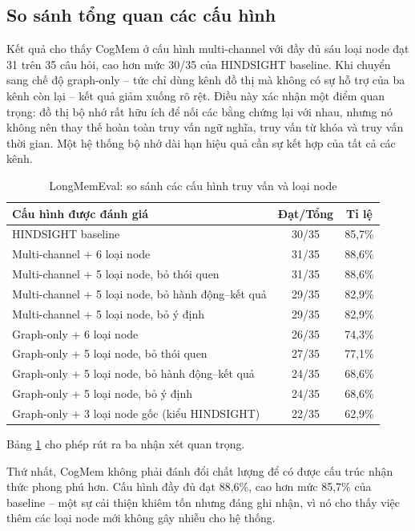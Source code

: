 \documentclass[../main.tex]{subfiles}
\begin{document}
\subsection{So sánh tổng quan các cấu hình}

Kết quả cho thấy CogMem ở cấu hình multi-channel với đầy đủ sáu loại node đạt 31 trên 35 câu hỏi, cao hơn mức 30/35 của HINDSIGHT baseline. Khi chuyển sang chế độ graph-only -- tức chỉ dùng kênh đồ thị mà không có sự hỗ trợ của ba kênh còn lại -- kết quả giảm xuống rõ rệt. Điều này xác nhận một điểm quan trọng: đồ thị bộ nhớ rất hữu ích để nối các bằng chứng lại với nhau, nhưng nó không nên thay thế hoàn toàn truy vấn ngữ nghĩa, truy vấn từ khóa và truy vấn thời gian. Một hệ thống bộ nhớ dài hạn hiệu quả cần sự kết hợp của tất cả các kênh.

\begin{table}[H]
\centering
\caption{LongMemEval: so sánh các cấu hình truy vấn và loại node}
\label{tab:longmemeval_results}
\small
\begin{tabularx}{\linewidth}{@{}p{8.5cm}cc@{}}
\toprule
\textbf{Cấu hình được đánh giá} & \textbf{Đạt/Tổng} & \textbf{Tỉ lệ} \\
\midrule
HINDSIGHT baseline & 30/35 & 85,7\% \\
Multi-channel + 6 loại node & 31/35 & 88,6\% \\
Multi-channel + 5 loại node, bỏ thói quen & 31/35 & 88,6\% \\
Multi-channel + 5 loại node, bỏ hành động--kết quả & 29/35 & 82,9\% \\
Multi-channel + 5 loại node, bỏ ý định & 29/35 & 82,9\% \\
Graph-only + 6 loại node & 26/35 & 74,3\% \\
Graph-only + 5 loại node, bỏ thói quen & 27/35 & 77,1\% \\
Graph-only + 5 loại node, bỏ hành động--kết quả & 24/35 & 68,6\% \\
Graph-only + 5 loại node, bỏ ý định & 24/35 & 68,6\% \\
Graph-only + 3 loại node gốc (kiểu HINDSIGHT) & 22/35 & 62,9\% \\
\bottomrule
\end{tabularx}
\end{table}

Bảng \ref{tab:longmemeval_results} cho phép rút ra ba nhận xét quan trọng. 

Thứ nhất, CogMem không phải đánh đổi chất lượng để có được cấu trúc nhận thức phong phú hơn. Cấu hình đầy đủ đạt 88,6\%, cao hơn mức 85,7\% của baseline -- một sự cải thiện khiêm tốn nhưng đáng ghi nhận, vì nó cho thấy việc thêm các loại node mới không gây nhiễu cho hệ thống.
\end{document}
